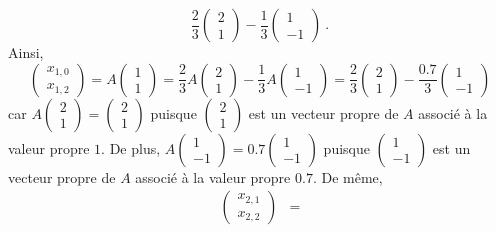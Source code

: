 {\begin{rmk}[\theory]
\[\frac{2}{3} \begin{pmatrix} 2 \\ 1 \end{pmatrix}
- \frac{1}{3} \begin{pmatrix} 1 \\ -1 \end{pmatrix} \ .
\]
Ainsi,
\[
\begin{pmatrix} x_{1,0} \\ x_{1,2} \end{pmatrix} = A
\begin{pmatrix} 1 \\ 1 \end{pmatrix}
= \frac{2}{3} A\begin{pmatrix} 2 \\ 1 \end{pmatrix}
- \frac{1}{3} A\begin{pmatrix} 1 \\ -1 \end{pmatrix}
= \frac{2}{3} \begin{pmatrix} 2 \\ 1 \end{pmatrix}
- \frac{0.7}{3} \begin{pmatrix} 1 \\ -1 \end{pmatrix}
\]
car $\displaystyle A\begin{pmatrix} 2 \\ 1 \end{pmatrix}
= \begin{pmatrix} 2 \\ 1 \end{pmatrix}$ puisque
$\begin{pmatrix} 2 \\ 1 \end{pmatrix}$ est un vecteur propre de $A$
associé à la valeur propre $1$. De plus,
$\displaystyle A\begin{pmatrix} 1 \\ -1 \end{pmatrix}
= 0.7 \begin{pmatrix} 1 \\ -1 \end{pmatrix}$ puisque
$\begin{pmatrix} 1 \\ -1 \end{pmatrix}$ est un vecteur propre de $A$
associé à la valeur propre $0.7$.  De même,
\begin{align*}
\begin{pmatrix} x_{2,1} \\ x_{2,2} \end{pmatrix} &=

\end{align*}
\end{rmk}}
